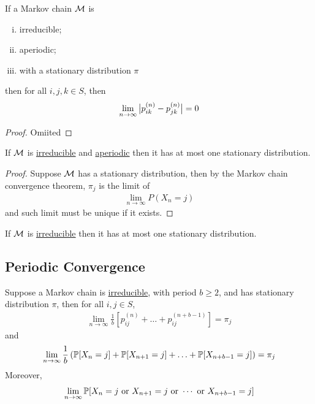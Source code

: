 \documentclass{article}
\newcommand{\upn}[0]{^{(n)}}
\begin{document}
	\begin{lemma}
		If a Markov chain $\mathcal{{M}}$ is
		\begin{enumerate}[(i)]
			\item irreducible;
			\item aperiodic;
			\item with a stationary distribution $\pi$
		\end{enumerate}
		then for all $i, j, k \in S$, then
		\begin{align}
			\lim_{n \to \infty} \abs{
				p_{ik}\upn - p_{jk}\upn
			} = 0
		\end{align}
	\end{lemma}
	
	\begin{proof}
		Omiited
	\end{proof}
	
	\begin{corollary}
		If $\mathcal{{M}}$ is \ul{irreducible} and \ul{aperiodic} then it has at most one stationary distribution.
	\end{corollary}

	\begin{proof}
		Suppose $\mathcal{{M}}$ has a stationary distribution, then by the Markov chain convergence theorem, $\pi_j$ is the limit of 
		\begin{align}
			\lim_{n \to \infty} P(X_n = j)
		\end{align}
		and such limit must be unique if it exists.
	\end{proof}

	\begin{corollary}
		If $\mathcal{{M}}$ is \ul{irreducible} then it has at most one stationary distribution.
	\end{corollary}
	\subsection{Periodic Convergence}
	\begin{theorem}
		Suppose a Markov chain is \ul{irreducible}, with period $b \geq 2$, and has stationary distribution $\pi$, then for all $i, j \in S$,
		\begin{align}
			\lim _{n \rightarrow \infty} \frac{1}{b}\left[p_{i j}^{(n)}+\ldots+p_{i j}^{(n+b-1)}\right]=\pi_{j}
		\end{align}
		and
		\begin{align}
			\lim _{n \rightarrow \infty} \frac{1}{b}\left(\mathbb{P}[{X_{n}=j}]+\mathbb{P}[{X_{n+1}=j}]+\ldots+\mathbb{P}[{X_{n+b-1}=j}]\right)=\pi_{j}
		\end{align}
		Moreover,
		\begin{align}
			\lim_{n \to \infty} \mathbb{P}[{X_{n}=j \text{{ or }} X_{n+1}=j \text{{ or }} \cdots \text{{ or }}X_{n+b-1}=j}]
		\end{align}
	\end{theorem}
	
\end{document}
